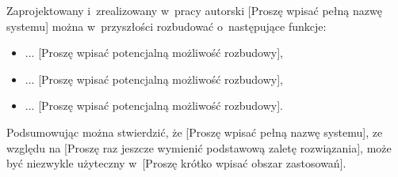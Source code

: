 Zaprojektowany i~zrealizowany w~pracy autorski [Proszę wpisać pełną nazwę systemu] można w~przyszłości rozbudować o~następujące funkcje:

\begin{itemize}
\item ... [Proszę wpisać potencjalną możliwość rozbudowy],
\item ... [Proszę wpisać potencjalną możliwość rozbudowy],
\item ... [Proszę wpisać potencjalną możliwość rozbudowy].
\end{itemize}

Podsumowując można stwierdzić, że [Proszę wpisać pełną nazwę systemu], ze względu na [Proszę raz jeszcze wymienić podstawową zaletę rozwiązania], może być niezwykle użyteczny w~[Proszę krótko wpisać obszar zastosowań].
